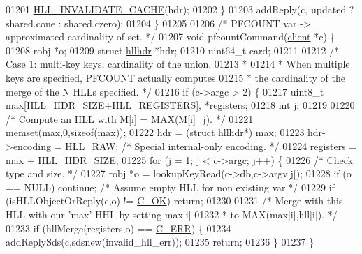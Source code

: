 \begin{DoxyCode}
{{01201         \hyperlink{hyperloglog_8c_aba6246a823dc41dc866a6af8828ae375}{HLL\_INVALIDATE\_CACHE}(hdr);
01202     \}
01203     addReply(c, updated ? shared.cone : shared.czero);
01204 \}
01205 
01206 \textcolor{comment}{/* PFCOUNT var -> approximated cardinality of set. */}
01207 \textcolor{keywordtype}{void} pfcountCommand(\hyperlink{structclient}{client} *c) \{
01208     robj *o;
01209     \textcolor{keyword}{struct} \hyperlink{structhllhdr}{hllhdr} *hdr;
01210     uint64\_t card;
01211 
01212     \textcolor{comment}{/* Case 1: multi-key keys, cardinality of the union.}
01213 \textcolor{comment}{     *}
01214 \textcolor{comment}{     * When multiple keys are specified, PFCOUNT actually computes}
01215 \textcolor{comment}{     * the cardinality of the merge of the N HLLs specified. */}
01216     \textcolor{keywordflow}{if} (c->argc > 2) \{
01217         uint8\_t max[\hyperlink{hyperloglog_8c_af04dc163054c4c79b0e6c93057b4032f}{HLL\_HDR\_SIZE}+\hyperlink{hyperloglog_8c_aa053beb90136828dcb46545c7445fc36}{HLL\_REGISTERS}], *registers;
01218         \textcolor{keywordtype}{int} j;
01219 
01220         \textcolor{comment}{/* Compute an HLL with M[i] = MAX(M[i]\_j). */}
01221         memset(max,0,\textcolor{keyword}{sizeof}(max));
01222         hdr = (\textcolor{keyword}{struct} \hyperlink{structhllhdr}{hllhdr}*) max;
01223         hdr->encoding = \hyperlink{hyperloglog_8c_aafa7fcced873855fe756c6e29831114a}{HLL\_RAW}; \textcolor{comment}{/* Special internal-only encoding. */}
01224         registers = max + \hyperlink{hyperloglog_8c_af04dc163054c4c79b0e6c93057b4032f}{HLL\_HDR\_SIZE};
01225         \textcolor{keywordflow}{for} (j = 1; j < c->argc; j++) \{
01226             \textcolor{comment}{/* Check type and size. */}
01227             robj *o = lookupKeyRead(c->db,c->argv[j]);
01228             \textcolor{keywordflow}{if} (o == NULL) \textcolor{keywordflow}{continue}; \textcolor{comment}{/* Assume empty HLL for non existing var.*/}
01229             \textcolor{keywordflow}{if} (isHLLObjectOrReply(c,o) != \hyperlink{server_8h_a303769ef1065076e68731584e758d3e1}{C\_OK}) \textcolor{keywordflow}{return};
01230 
01231             \textcolor{comment}{/* Merge with this HLL with our 'max' HHL by setting max[i]}
01232 \textcolor{comment}{             * to MAX(max[i],hll[i]). */}
01233             \textcolor{keywordflow}{if} (hllMerge(registers,o) == \hyperlink{server_8h_af98ac28d5f4d23d7ed5985188e6fb7d1}{C\_ERR}) \{
01234                 addReplySds(c,sdsnew(invalid\_hll\_err));
01235                 \textcolor{keywordflow}{return};
01236             \}
01237         \}
}}
\end{DoxyCode}
